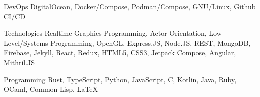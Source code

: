 

\begin{cvskills}

  \cvskill
    {DevOps} %
    {DigitalOcean, Docker/Compose, Podman/Compose, GNU/Linux, Github CI/CD} %

  \cvskill
    {Technologies} %
    {Realtime Graphics Programming, Actor-Orientation, Low-Level/Systems Programming, OpenGL, Express.JS, Node.JS, REST, MongoDB, Firebase, Jekyll, React, Redux, HTML5, CSS3, Jetpack Compose, Angular, Mithril.JS} %

  \cvskill
    {Programming} %
    {Rust, TypeScript, Python, JavaScript, C, Kotlin, Java, Ruby, OCaml, Common Lisp, LaTeX} %

\end{cvskills}
